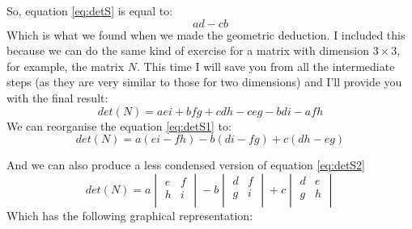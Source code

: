 \documentclass[600paper, 11pt,twoside,openany]{kdp}
\begin{document}
\indent So, equation \ref{eq:detS} is equal to:
\[ad - cb\]
\indent Which is what we found when we made the geometric deduction. I included this because we can do the same kind of exercise for a matrix with dimension $3 \times 3$, for example, the matrix $N$. This time I will save you from all the intermediate steps (as they are very similar to those for two dimensions) and I’ll provide you with the final result:
\begin{equation}\label{eq:detS1}
det(N) = aei + bfg + cdh - ceg -bdi -afh
\end{equation}
\indent We can reorganise the equation \ref{eq:detS1} to:
\begin{equation}\label{eq:detS2}
det(N) = a(ei-fh) - b(di-fg) + c(dh -eg)
\end{equation}
\par 
\vspace{-3pt}
\indent And we can also produce a less condensed version of equation \ref{eq:detS2}
\begin{equation}\label{eq:det}
det(N) =  a\begin{vmatrix}
e & f   \\
h & i \\ 
\end{vmatrix}  - b\begin{vmatrix}
d & f   \\
g & i \\
\end{vmatrix}    +  c\begin{vmatrix}
d & e   \\
g & h \\
\end{vmatrix}
\end{equation}
\indent Which has the following graphical representation:
\end{document}
